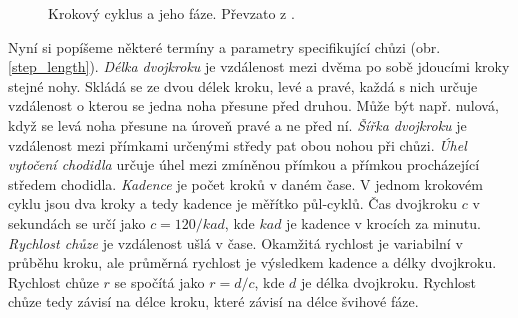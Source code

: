 \begin{figure}[h]
\begin{center}
\caption{Krokový cyklus a jeho fáze. Převzato z \cite{gait_img}.} \label{gait_cycle}
\end{center}
\end{figure}

Nyní si popíšeme některé termíny a parametry specifikující chůzi (obr. \ref{step_length}). \textit{Délka dvojkroku} je vzdálenost mezi dvěma po sobě jdoucími kroky stejné nohy. Skládá se ze dvou délek kroku, levé a pravé, každá s nich určuje vzdálenost o kterou se jedna noha přesune před druhou. Může být např. nulová, když se levá noha přesune na úroveň pravé a ne před ní. \textit{Šířka dvojkroku} je vzdálenost mezi přímkami určenými středy pat obou nohou při chůzi. \textit{Úhel vytočení chodidla} určuje úhel mezi zmíněnou přímkou a přímkou procházející středem chodidla. \textit{Kadence} je počet kroků v daném čase. V jednom krokovém cyklu jsou dva kroky a tedy kadence je měřítko  půl-cyklů. Čas dvojkroku $c$ v sekundách se určí jako $c = 120/kad$, kde $kad$ je kadence v krocích za minutu. \textit{Rychlost chůze} je vzdálenost ušlá v čase. Okamžitá rychlost je variabilní v průběhu kroku, ale průměrná rychlost je výsledkem kadence a délky dvojkroku. Rychlost chůze $r$ se spočítá jako $r = d/c$, kde $d$ je délka dvojkroku. Rychlost chůze tedy závisí na délce kroku, které závisí na délce švihové fáze.

